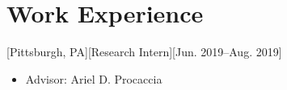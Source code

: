 \documentclass{article}
\begin{document}
%
%
%
%
%
%
%
%
%
%
%
%
%

\section{Work Experience}
	
    [Pittsburgh, PA][Research Intern][Jun. 2019--Aug. 2019]
    \begin{itemize}[noitemsep,nolistsep]
        \item Advisor: Ariel D. Procaccia
    \end{itemize}
    
\end{document}
